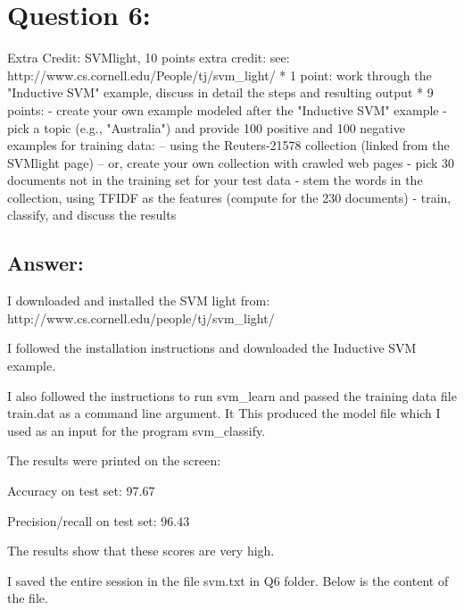 \section*{Question 6:}
Extra Credit: SVMlight, 10 points extra credit:
see: http://www.cs.cornell.edu/People/tj/svm\_light/
* 1 point:
work through the "Inductive SVM" example, discuss in detail the steps and resulting output
* 9 points: 
- create your own example modeled after the "Inductive SVM" example
- pick a topic (e.g., "Australia") and provide 100 positive and 100 negative examples for training data:
  -- using the Reuters-21578 collection (linked from the SVMlight page)
  -- or, create your own collection with crawled web pages 
- pick 30 documents not in the training set for your test data
- stem the words in the collection, using TFIDF as the features (compute for the 230 documents)
- train, classify, and discuss the results

\subsection*{Answer:}

I downloaded and installed the SVM light from: http://www.cs.cornell.edu/people/tj/svm\_light/

I followed the installation instructions and downloaded the Inductive SVM example.

I also followed the instructions to run svm\_learn and passed the training data ﬁle train.dat as a command line argument. It  This produced the model ﬁle which I used as an input for the program svm\_classify.

The results were printed on the screen:

Accuracy on test set: 97.67%

Precision/recall on test set: 96.43%

The results show that these scores are very high.

I saved the entire session in the file svm.txt in Q6 folder. Below is the content of the file. 


